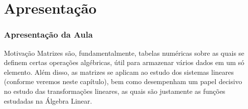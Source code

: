\section{Apresentação}


\begin{frame}
    \frametitle{Apresentação da Aula}
    
    \begin{block}{Motivação}
        Matrizes são, fundamentalmente, tabelas numéricas sobre as quais se definem certas operações algébricas, útil para armazenar vários dados em um só elemento. Além disso, as matrizes se aplicam ao estudo dos sistemas lineares (conforme veremos neste capítulo), bem como desempenham um papel decisivo no estudo das transformações lineares, as quais são justamente as funções estudadas na Álgebra Linear.
    \end{block}
\end{frame}
